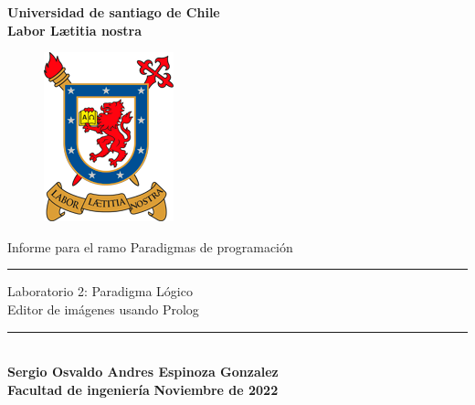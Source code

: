\begin{titlepage}
    \begin{center}
        {\LARGE \textbf{Universidad de santiago de Chile}}\\
        \vspace{0.25cm}
        {\large \textbf{Labor L\ae titia nostra}}
        \vspace{1cm}
        \begin{figure}[h]
            \centering
            \includegraphics[scale=1.5]{Contenido/Imagenes/Logo color.png}
        \end{figure}
        
        {\Large  Informe para el ramo Paradigmas de programación}
        \vspace{0.3cm}
        \rule{15cm}{0.5mm}
        {\Large Laboratorio 2: Paradigma Lógico\\ Editor de imágenes usando Prolog}
        \rule{15cm}{0.5mm}
        \vspace{2cm}
        \\
        {\Large \textbf{Sergio Osvaldo Andres Espinoza Gonzalez}}\\
        \vspace{0.5cm}
        {\Large \textbf{Facultad de ingeniería}}
        \vfill
        {\Huge \textbf{Noviembre de 2022}}
    \end{center}
\end{titlepage}